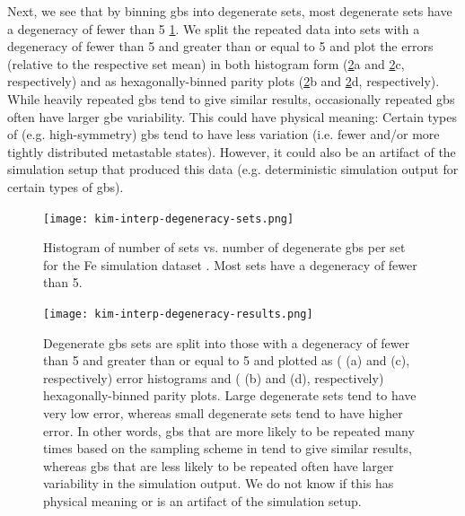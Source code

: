 \documentclass[preprint,12pt]{elsarticle}
\begin{document}
	Next, we see that by binning \glspl{gb} into degenerate sets, most degenerate sets have a degeneracy of fewer than 5 \cref{fig:kim-interp-degeneracy-sets}. We split the repeated data into sets with a degeneracy of fewer than 5 and greater than or equal to 5 and plot the errors (relative to the respective set mean) in both histogram form (\cref{fig:kim-interp-degeneracy-results}a and \cref{fig:kim-interp-degeneracy-results}c, respectively) and as hexagonally-binned parity plots (\cref{fig:kim-interp-degeneracy-results}b and \cref{fig:kim-interp-degeneracy-results}d, respectively). While heavily repeated \glspl{gb} tend to give similar results, occasionally repeated \glspl{gb} often have larger \gls{gbe} variability. This could have physical meaning: Certain types of (e.g. high-symmetry) \glspl{gb} tend to have less variation (i.e. fewer and/or more tightly distributed metastable states). However, it could also be an artifact of the simulation setup that produced this data (e.g. deterministic simulation output for certain types of \glspl{gb}).
	
	\begin{figure}
		\centering
		\texttt{[image: kim-interp-degeneracy-sets.png]}
		\caption{Histogram of number of sets vs. number of degenerate \glspl{gb} per set for the Fe simulation dataset \cite{kimPhasefieldModeling3D2014}. Most sets have a degeneracy of fewer than 5.}
		\label{fig:kim-interp-degeneracy-sets}
	\end{figure}
	
	\begin{figure}
		\centering
		\texttt{[image: kim-interp-degeneracy-results.png]}
		\caption{Degenerate \glspl{gb} sets are split into those with a degeneracy of fewer than 5 and greater than or equal to 5 and plotted as ( (a) and (c), respectively) error histograms and ( (b) and (d), respectively) hexagonally-binned parity plots. Large degenerate sets tend to have very low error, whereas small degenerate sets tend to have higher error. In other words, \glspl{gb} that are more likely to be repeated many times based on the sampling scheme in \cite{kimPhasefieldModeling3D2014} tend to give similar results, whereas \glspl{gb} that are less likely to be repeated often have larger variability in the simulation output. We do not know if this has physical meaning or is an artifact of the simulation setup.}
		\label{fig:kim-interp-degeneracy-results}
	\end{figure}
\end{document}
